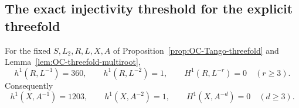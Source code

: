 \subsection{The exact injectivity threshold for the explicit threefold}

\begin{lemma}
\label{lem:OC-threefold-negative-degrees}
For the fixed $S,L_2,R,L,X,A$ of
Proposition~\ref{prop:OC-Tango-threefold} and
Lemma~\ref{lem:OC-threefold-multiroot},
\[
 h^1(R,L^{-1})=360,\qquad h^1(R,L^{-2})=1,\qquad
 H^1(R,L^{-r})=0\quad(r\geq3).
\]
Consequently
\[
 h^1(X,A^{-1})=1203,\qquad h^1(X,A^{-2})=1,\qquad
 H^1(X,A^{-d})=0\quad(d\geq3).
\]
\end{lemma}
